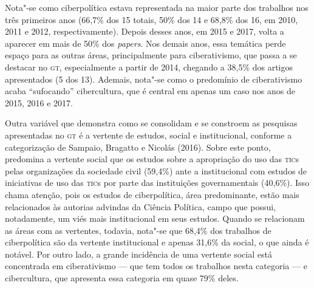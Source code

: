 
Nota"-se como ciberpolítica estava representada na maior parte dos
trabalhos nos três primeiros anos (66,7\% dos 15 totais, 50\% dos 14 e
68,8\% dos 16, em 2010, 2011 e 2012, respectivamente). Depois desses
anos, em 2015 e 2017, volta a aparecer em mais de 50\% dos
\emph{papers}. Nos demais anos, essa temática perde espaço para as
outras áreas, principalmente para ciberativismo, que passa a se destacar
no \textsc{gt}, especialmente a partir de 2014, chegando a 38,5\% dos artigos
apresentados (5 dos 13). Ademais, nota"-se como o predomínio de
ciberativismo acaba ``sufocando'' cibercultura, que é central em apenas
um caso nos anos de 2015, 2016 e 2017.

Outra variável que demonstra como se consolidam e se constroem as
pesquisas apresentadas no \textsc{gt} é a vertente de estudos, social e
institucional, conforme a categorização de Sampaio, Bragatto e Nicolás
(2016). Sobre este ponto, predomina a vertente social que os estudos
sobre a apropriação do uso das \textsc{tic}s pelas organizações da sociedade
civil (59,4\%) ante a institucional com estudos de iniciativas de uso
das \textsc{tic}s por parte das instituições governamentais (40,6\%). Isso chama
atenção, pois os estudos de ciberpolítica, área predominante, estão mais
relacionados às autorias advindas da Ciência Política, campo que possui,
notadamente, um viés mais institucional em seus estudos. Quando se
relacionam as áreas com as vertentes, todavia, nota"-se que 68,4\% dos
trabalhos de ciberpolítica são da vertente institucional e apenas 31,6\%
da social, o que ainda é notável. Por outro lado, a grande incidência de
uma vertente social está concentrada em ciberativismo --- que tem todos
os trabalhos nesta categoria --- e cibercultura, que apresenta essa
categoria em quase 79\% deles.

\pagebreak

